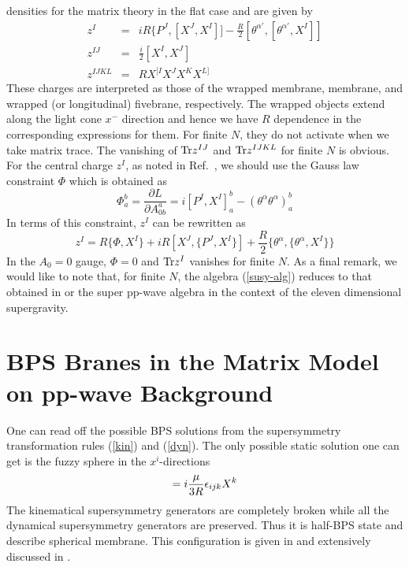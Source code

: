 \documentclass[a4paper,12pt]{article}
\begin{document}
densities for the matrix theory in the flat case \cite{ban157} and
are given by
\begin{eqnarray}
z^I &=& i R \{ P^J, [ X^J, X^I ]]
 - \frac{R}{2} [ \theta^{\alpha'}, [ \theta^{\alpha'}, X^I ]]
                                    \nonumber \\
z^{IJ} &=& \frac{i}{2} [ X^I, X^J ]
                                    \nonumber \\
z^{IJKL} &=& R X^{[I} X^J X^K X^{L]}
\end{eqnarray}
These charges are interpreted as those of the wrapped membrane,
membrane, and wrapped (or longitudinal) fivebrane, respectively.  The
wrapped objects extend along the light cone $x^-$ direction and hence
we have $R$ dependence in the corresponding expressions for them.  For
finite $N$, they do not activate when we take matrix trace.  The
vanishing of ${\rm Tr} z^{IJ}$ and ${\rm Tr} z^{IJKL}$ for finite $N$
is obvious.  For the central charge $z^I$, as noted in
Ref.~\cite{ban157}, we should use the Gauss law constraint $\Phi$
which is obtained as
\begin{equation}
\Phi_a^b = \frac{\partial L }{\partial A_{0b}^a} = i[ P^I, X^I
]_a^b - (\theta^\alpha \theta^\alpha)_a^b
\end{equation}
In terms of this constraint, $z^I$ can be rewritten as
\begin{equation}
z^I  = R \{ \Phi, X^I \} + i R [ X^J, \{ P^J, X^I \} ]
 + \frac{R}{2} \{ \theta^\alpha, \{ \theta^\alpha, X^I \}\}
\end{equation}
In the $A_0=0$ gauge, $\Phi=0$ and ${\rm Tr} z^I$ vanishes for
finite $N$.  As a final remark, we would like to note that, for
finite $N$, the algebra (\ref{susy-alg}) reduces to that obtained
in \cite{das185} or the super pp-wave algebra \cite{hat002} in the
context of the eleven dimensional supergravity.



\section{BPS Branes in the Matrix Model on pp-wave Background}
\label{brane}

One can read off the possible BPS solutions from the supersymmetry
transformation rules (\ref{kin}) and (\ref{dyn}). The only
possible static solution one can get is the fuzzy sphere in the
$x^i$-directions\cite{ber021}
\begin{equation}
[ X^i, X^j ] = i {\mu \over 3R}\epsilon_{ijk} X^k
\end{equation}
The kinematical supersymmetry generators are completely broken
while all the dynamical supersymmetry generators are preserved.
Thus it is half-BPS state and describe spherical membrane. This
configuration is given in \cite{ber021} and extensively discussed
in \cite{das185}.
\end{document}
